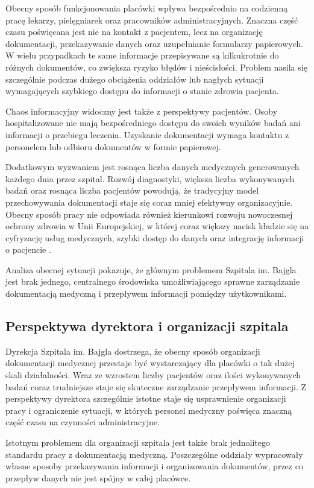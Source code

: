 Obecny sposób funkcjonowania placówki wpływa bezpośrednio na codzienną pracę lekarzy, pielęgniarek oraz pracowników administracyjnych. Znaczna część czasu poświęcana jest nie na kontakt z pacjentem, lecz na organizację dokumentacji, przekazywanie danych oraz uzupełnianie formularzy papierowych. W wielu przypadkach te same informacje przepisywane są kilkukrotnie do różnych dokumentów, co zwiększa ryzyko błędów i nieścisłości. Problem nasila się szczególnie podczas dużego obciążenia oddziałów lub nagłych sytuacji wymagających szybkiego dostępu do informacji o stanie zdrowia pacjenta.

Chaos informacyjny widoczny jest także z perspektywy pacjentów. Osoby hospitalizowane nie mają bezpośredniego dostępu do swoich wyników badań ani informacji o przebiegu leczenia. Uzyskanie dokumentacji wymaga kontaktu z personelem lub odbioru dokumentów w formie papierowej.

Dodatkowym wyzwaniem jest rosnąca liczba danych medycznych generowanych każdego dnia przez szpital. Rozwój diagnostyki, większa liczba wykonywanych badań oraz rosnąca liczba pacjentów powodują, że tradycyjny model przechowywania dokumentacji staje się coraz mniej efektywny organizacyjnie. Obecny sposób pracy nie odpowiada również kierunkowi rozwoju nowoczesnej ochrony zdrowia w Unii Europejskiej, w której coraz większy nacisk kładzie się na cyfryzację usług medycznych, szybki dostęp do danych oraz integrację informacji o pacjencie \cite{EU_eHealth_2024}.

Analiza obecnej sytuacji pokazuje, że głównym problemem Szpitala im. Bajgla jest brak jednego, centralnego środowiska umożliwiającego sprawne zarządzanie dokumentacją medyczną i przepływem informacji pomiędzy użytkownikami. 
\subsection{Perspektywa dyrektora i organizacji szpitala}

Dyrekcja Szpitala im. Bajgla dostrzega, że obecny sposób organizacji dokumentacji medycznej przestaje być wystarczający dla placówki o tak dużej skali działalności. Wraz ze wzrostem liczby pacjentów oraz ilości wykonywanych badań coraz trudniejsze staje się skuteczne zarządzanie przepływem informacji. Z perspektywy dyrektora szczególnie istotne staje się usprawnienie organizacji pracy i ograniczenie sytuacji, w których personel medyczny poświęca znaczną część czasu na czynności administracyjne.

Istotnym problemem dla organizacji szpitala jest także brak jednolitego standardu pracy z dokumentacją medyczną. Poszczególne oddziały wypracowały własne sposoby przekazywania informacji i organizowania dokumentów, przez co przepływ danych nie jest spójny w całej placówce.

